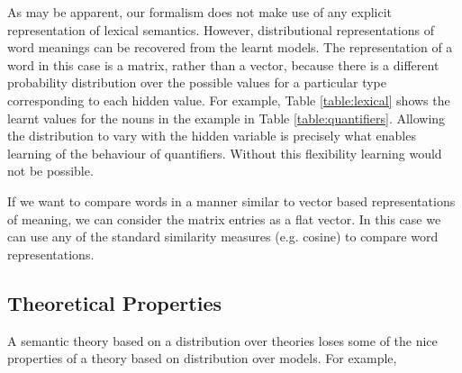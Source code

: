 \documentclass{svmult}
\begin{document}
As may be apparent, our formalism does not make use of any explicit representation of
lexical semantics. However, distributional representations of word
meanings can be recovered from the learnt models. The representation
of a word in this case is a matrix, rather than a vector, because there is a different 
probability distribution over the possible values for a particular
type corresponding to each hidden value. For example, Table \ref{table:lexical} shows the learnt
values for the nouns in the example in Table
\ref{table:quantifiers}. Allowing the distribution to vary with the
hidden variable is precisely what enables learning of the behaviour of
quantifiers. Without this flexibility learning would not be possible.

If we want to compare words in a manner similar to vector based
representations of meaning, we can consider the matrix entries as a
flat vector. In this case we can use any of the standard similarity measures (e.g. 
cosine) to compare word representations.



\subsection{Theoretical Properties}

A semantic theory based on a distribution over theories loses some of
the nice properties of a theory based on distribution over models. For
example,


\end{document}
